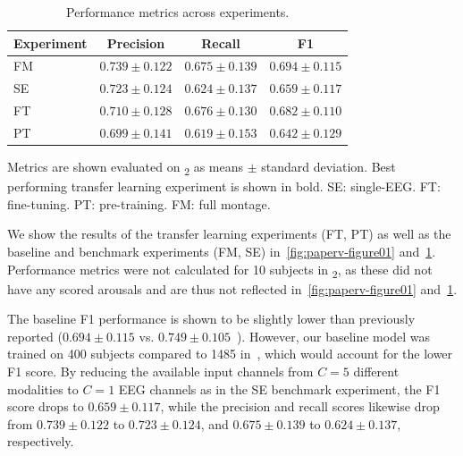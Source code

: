 \begin{table}[tb]
    \centering
    \begin{threeparttable}
        \footnotesize
        \caption{Performance metrics across experiments.}
        \label{tab:paperv-results}
        \begin{tabular}{@{}lccc@{}}
        \toprule
        \textbf{Experiment} &        \textbf{Precision} &           \textbf{Recall} &               \textbf{F1} \\ \midrule
        FM &  $0.739 \pm 0.122$ &  $0.675 \pm 0.139$ &  $0.694 \pm 0.115$ \\
        SE &  $0.723 \pm 0.124$ &  $0.624 \pm 0.137$ &  $0.659 \pm 0.117$ \\ \midrule
        FT &  $\mathbf{0.710 \pm 0.128}$ &  $\mathbf{0.676 \pm 0.130}$ & $\mathbf{0.682 \pm 0.110}$ \\
        PT &  $0.699 \pm 0.141$ &  $0.619 \pm 0.153$ &  $0.642 \pm 0.129$ \\
        \bottomrule
        \end{tabular}
        \begin{tablenotes}
            \small
            \item Metrics are shown evaluated on \test\textsubscript{2} as means $\pm$ standard deviation. Best performing transfer learning experiment is shown in bold. SE: single-EEG. FT: fine-tuning. PT: pre-training. FM: full montage.
        \end{tablenotes}
    \end{threeparttable}
\end{table}

We show the results of the transfer learning experiments (FT, PT) as well as the baseline and benchmark experiments (FM, SE) in~\cref{fig:paperv-figure01} and~\cref{tab:paperv-results}. 
Performance metrics were not calculated for \num{10} subjects in \test\textsubscript{2}, as these did not have any scored arousals and are thus not reflected in~\cref{fig:paperv-figure01} and~\cref{tab:paperv-results}.

The baseline F1 performance is shown to be slightly lower than previously reported ($0.694 \pm 0.115$ vs. $0.749 \pm 0.105$~\cite{Olesen2019}).
However, our baseline model was trained on \num{400} subjects compared to \num{1485} in~\cite{Olesen2019}, which would account for the lower F1 score. 
By reducing the available input channels from $C=5$ different modalities to $C=1$ EEG channels as in the SE benchmark experiment, the F1 score drops to $0.659 \pm 0.117$, while the precision and recall scores likewise drop from $0.739 \pm 0.122$ to $0.723 \pm 0.124$, and $0.675 \pm 0.139$ to $0.624 \pm 0.137$, respectively.

